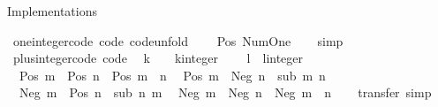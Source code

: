 \begin{isabellebody}
\endisatagproof
{\isafoldproof}%
%
\isadelimproof
%
\endisadelimproof
%
\begin{isamarkuptext}%
Implementations%
\end{isamarkuptext}\isamarkuptrue%
\isamarkupfalse%
\ one{\isacharunderscore}{\kern0pt}integer{\isacharunderscore}{\kern0pt}code\ {\isacharbrackleft}{\kern0pt}code{\isacharcomma}{\kern0pt}\ code{\isacharunderscore}{\kern0pt}unfold{\isacharbrackright}{\kern0pt}{\isacharcolon}{\kern0pt}\isanewline
\ \ {\isachardoublequoteopen}{}\ {\isacharequal}{\kern0pt}\ Pos\ Num{\isachardot}{\kern0pt}One{\isachardoublequoteclose}\isanewline
%
\isadelimproof
\ \ %
\endisadelimproof
%
\isatagproof
{}\isamarkupfalse%
\ simp%
\endisatagproof
{\isafoldproof}%
%
\isadelimproof
\isanewline
%
\endisadelimproof
\isanewline
{}\isamarkupfalse%
\ plus{\isacharunderscore}{\kern0pt}integer{\isacharunderscore}{\kern0pt}code\ {\isacharbrackleft}{\kern0pt}code{\isacharbrackright}{\kern0pt}{\isacharcolon}{\kern0pt}\isanewline
\ \ {\isachardoublequoteopen}k\ {\isacharplus}{\kern0pt}\ {}\ {\isacharequal}{\kern0pt}\ {\isacharparenleft}{\kern0pt}k{\isacharcolon}{\kern0pt}{\isacharcolon}{\kern0pt}integer{\isacharparenright}{\kern0pt}{\isachardoublequoteclose}\isanewline
\ \ {\isachardoublequoteopen}{}\ {\isacharplus}{\kern0pt}\ l\ {\isacharequal}{\kern0pt}\ {\isacharparenleft}{\kern0pt}l{\isacharcolon}{\kern0pt}{\isacharcolon}{\kern0pt}integer{\isacharparenright}{\kern0pt}{\isachardoublequoteclose}\isanewline
\ \ {\isachardoublequoteopen}Pos\ m\ {\isacharplus}{\kern0pt}\ Pos\ n\ {\isacharequal}{\kern0pt}\ Pos\ {\isacharparenleft}{\kern0pt}m\ {\isacharplus}{\kern0pt}\ n{\isacharparenright}{\kern0pt}{\isachardoublequoteclose}\isanewline
\ \ {\isachardoublequoteopen}Pos\ m\ {\isacharplus}{\kern0pt}\ Neg\ n\ {\isacharequal}{\kern0pt}\ sub\ m\ n{\isachardoublequoteclose}\isanewline
\ \ {\isachardoublequoteopen}Neg\ m\ {\isacharplus}{\kern0pt}\ Pos\ n\ {\isacharequal}{\kern0pt}\ sub\ n\ m{\isachardoublequoteclose}\isanewline
\ \ {\isachardoublequoteopen}Neg\ m\ {\isacharplus}{\kern0pt}\ Neg\ n\ {\isacharequal}{\kern0pt}\ Neg\ {\isacharparenleft}{\kern0pt}m\ {\isacharplus}{\kern0pt}\ n{\isacharparenright}{\kern0pt}{\isachardoublequoteclose}\isanewline
%
\isadelimproof
\ \ %
\endisadelimproof
%
\isatagproof
{}\isamarkupfalse%
\ {\isacharparenleft}{\kern0pt}transfer{\isacharcomma}{\kern0pt}\ simp{\isacharparenright}{\kern0pt}{\isacharplus}{\kern0pt}%
\endisatagproof
{\isafoldproof}%
%
\isadelimproof
\isanewline
%
\endisadelimproof

\end{isabellebody}
